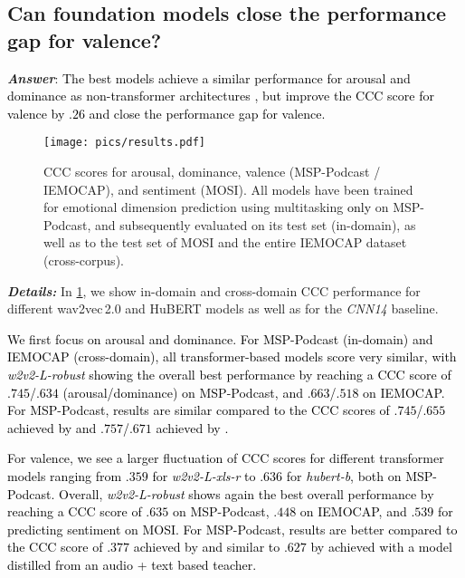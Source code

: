 \documentclass{article}
\newcommand\cnn{\mbox{\emph{CNN14}}}
\newcommand\hbase{\mbox{\emph{hubert-b}}}
\newcommand\wrobust{\mbox{\emph{w2v2-L-robust}}}
\newcommand\wxlsr{\mbox{\emph{w2v2-L-xls-r}}}
\newcommand{\review}[1]{\textcolor{black}{#1}}
\newcommand\msppodcast{\mbox{MSP-Podcast}}
\newcommand\iemocap{\mbox{IEMOCAP}}
\newcommand\mosi{\mbox{MOSI}}
\newcommand{\wtov}{wav2vec\,2.0}
\newcommand{\hubert}{HuBERT}
\begin{document}
\subsection{Can foundation models close the performance gap for valence?}
\label{subsec:valence_gap}

\emph{\textbf{Answer}}:
\review{The best models achieve a similar performance for arousal and dominance 
as non-transformer architectures \citep{li2021contrastive},
but improve the \ac{CCC} score for valence by $.26$
and close the performance gap for valence.}

\begin{figure}[t]
    \centering
    \texttt{[image: pics/results.pdf]}
    \caption{
        \ac{CCC} scores for arousal, dominance, valence ({\msppodcast} / {\iemocap}), and sentiment ({\mosi}).
        All models have been trained for emotional dimension prediction using multitasking \review{only} on {\msppodcast},
        and subsequently evaluated on its test set (in-domain),
        as well as to the test set of {\mosi}
        and the entire {\iemocap} dataset (cross-corpus).
    }
    \label{fig:results}
\end{figure}

\noindent
\emph{\textbf{Details:}}
In \cref{fig:results},
we show in-domain and cross-domain \ac{CCC} performance for different {\wtov} and {\hubert} models 
as well as for the {\cnn} baseline.

\review{
We first focus on arousal and dominance.
For {\msppodcast} (in-domain)
and {\iemocap} (cross-domain),
all transformer-based models score
very similar,
with {\wrobust} showing the overall best performance
by reaching a \ac{CCC} score of $.745$/$.634$ (arousal/dominance)
on {\msppodcast},
and $.663$/$.518$
on {\iemocap}.
For {\msppodcast}, results are similar
compared to the \ac{CCC} scores of $.745$/$.655$ 
achieved by \citet{li2021contrastive}
and $.757$/$.671$
achieved by \citet{srinivasan2021representation}.
}

\review{
For valence,
we see a larger fluctuation of \ac{CCC} scores
for different transformer models
ranging from $.359$ for {\wxlsr}
to $.636$ for {\hbase},
both on {\msppodcast}.
Overall,
{\wrobust} shows again the best overall performance
by reaching a \ac{CCC} score of $.635$ on {\msppodcast},
$.448$ on {\iemocap},
and $.539$ for predicting sentiment on {\mosi}.
For {\msppodcast}, results are better
compared to the \ac{CCC} score of $.377$
achieved by \citet{li2021contrastive}
and similar to $.627$
by \citet{srinivasan2021representation}
achieved with a model distilled from an audio + text based teacher.
}
\end{document}
